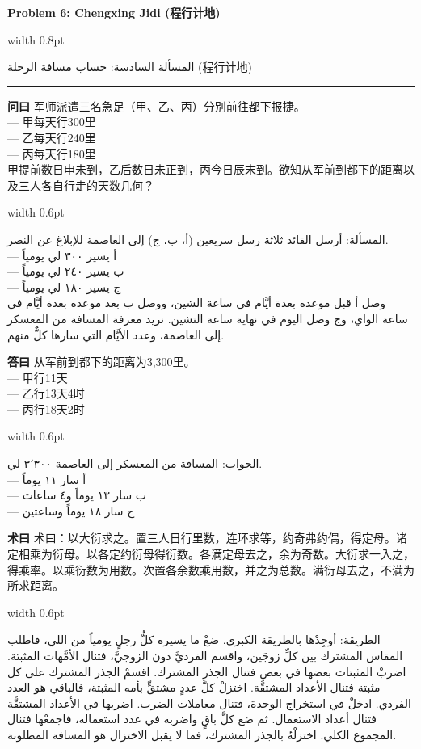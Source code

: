 \documentclass[11pt,a4paper]{article}
\newlength{\cnwidth}
\newlength{\arwidth}
\newcommand{\paralleltext}[2]{%
  \par\medskip\noindent
  \begin{minipage}[t]{\cnwidth}%
    \small #1%
  \end{minipage}%
  \hfill\textcolor{colrule}{\vrule width 0.6pt}\hfill
  \begin{minipage}[t]{\arwidth}%
    \small\arabicfont\beginR #2\endR%
  \end{minipage}%
  \par\medskip
}
\newcommand{\parallelsection}[2]{%
  \par\bigskip\noindent
  \begin{minipage}[t]{\cnwidth}%
    \Large\bfseries\color{sectioncolor} #1%
  \end{minipage}%
  \hfill\textcolor{colrule}{\vrule width 0.8pt}\hfill
  \begin{minipage}[t]{\arwidth}%
    \Large\arabicfontbf\color{sectioncolor}\beginR #2\endR%
  \end{minipage}%
  \par\medskip\noindent\textcolor{colrule}{\rule{\textwidth}{0.6pt}}\par\medskip
}
\newcommand{\cnlabel}[1]{\textbf{\color{notecolor}#1}}
\newcommand{\arlabel}[1]{\arabicfontbf\color{notecolor}\beginR #1\endR}
\begin{document}
\newpage

\parallelsection{Problem 6: Chengxing Jidi (程行计地)}{المسألة السادسة: حساب مسافة الرحلة (程行计地)}

\paralleltext{%
\cnlabel{问曰} 军师派遣三名急足（甲、乙、丙）分别前往都下报捷。\\
--- 甲每天行300里\\
--- 乙每天行240里\\
--- 丙每天行180里\\
甲提前数日申未到，乙后数日未正到，丙今日辰末到。欲知从军前到都下的距离以及三人各自行走的天数几何？%
}{%
\arlabel{المسألة:} أرسل القائد ثلاثة رسل سريعين (أ، ب، ج) إلى العاصمة للإبلاغ عن النصر.\\
--- أ يسير ٣٠٠ لي يومياً\\
--- ب يسير ٢٤٠ لي يومياً\\
--- ج يسير ١٨٠ لي يومياً\\
وصل أ قبل موعده بعدة أيَّام في ساعة الشين، ووصل ب بعد موعده بعدة أيَّام في ساعة الواي، وج وصل اليوم في نهاية ساعة التشين. نريد معرفة المسافة من المعسكر إلى العاصمة، وعدد الأيَّام التي سارها كلٌّ منهم.
}

\paralleltext{%
\cnlabel{答曰} 从军前到都下的距离为3,300里。\\
--- 甲行11天\\
--- 乙行13天4时\\
--- 丙行18天2时%
}{%
\arlabel{الجواب:} المسافة من المعسكر إلى العاصمة ٣٬٣٠٠ لي.\\
--- أ سار ١١ يوماً\\
--- ب سار ١٣ يوماً و٤ ساعات\\
--- ج سار ١٨ يوماً وساعتين
}

\paralleltext{%
\cnlabel{术曰} 术曰：以大衍求之。置三人日行里数，连环求等，约奇弗约偶，得定母。诸定相乘为衍母。以各定约衍母得衍数。各满定母去之，余为奇数。大衍求一入之，得乘率。以乘衍数为用数。次置各余数乘用数，并之为总数。满衍母去之，不满为所求距离。%
}{%
\arlabel{الطريقة:} أوجِدْها بالطريقة الكبرى. ضعْ ما يسيره كلُّ رجلٍ يومياً من اللي، فاطلب المقاس المشترك بين كلِّ زوجَين، واقسم الفرديَّ دون الزوجيَّ، فتنال الأمَّهات المثبتة. اضربْ المثبتات بعضها في بعض فتنال الجذر المشترك. اقسمْ الجذر المشترك على كل مثبتة فتنال الأعداد المشتقَّة. اختزلْ كلَّ عددٍ مشتقٍّ بأمه المثبتة، فالباقي هو العدد الفردي. ادخلْ في استخراج الوحدة، فتنال معاملات الضرب. اضربها في الأعداد المشتقَّة فتنال أعداد الاستعمال. ثم ضع كلَّ باقٍ واضربه في عدد استعماله، فاجمعْها فتنال المجموع الكلي. اختزلْهُ بالجذر المشترك، فما لا يقبل الاختزال هو المسافة المطلوبة.
}
\end{document}
